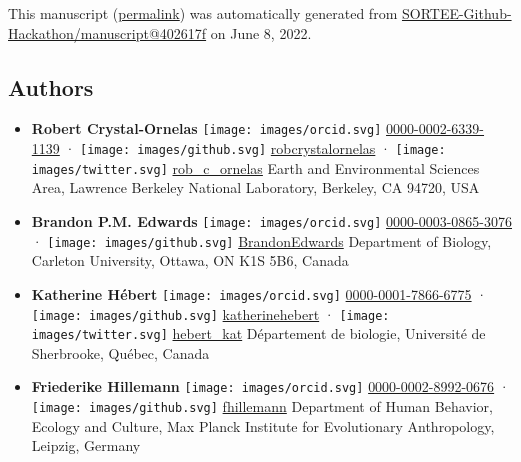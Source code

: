 This manuscript
(\href{https://SORTEE-Github-Hackathon.github.io/manuscript/v/402617f9e4b0caf2a3e126b79bf17059d3cfef8c/}{permalink})
was automatically generated
from \href{https://github.com/SORTEE-Github-Hackathon/manuscript/tree/402617f9e4b0caf2a3e126b79bf17059d3cfef8c}{SORTEE-Github-Hackathon/manuscript@402617f}
on June 8, 2022.

\hypertarget{authors}{%
\subsection{Authors}\label{authors}}

\begin{itemize}
\item
  \textbf{Robert Crystal-Ornelas}
  \texttt{[image: images/orcid.svg]}
  \href{https://orcid.org/0000-0002-6339-1139}{0000-0002-6339-1139}
  · \texttt{[image: images/github.svg]}
  \href{https://github.com/robcrystalornelas}{robcrystalornelas}
  · \texttt{[image: images/twitter.svg]}
  \href{https://twitter.com/rob_c_ornelas}{rob\_c\_ornelas}
  Earth and Environmental Sciences Area, Lawrence Berkeley National Laboratory, Berkeley, CA 94720, USA
\item
  \textbf{Brandon P.M. Edwards}
  \texttt{[image: images/orcid.svg]}
  \href{https://orcid.org/0000-0003-0865-3076}{0000-0003-0865-3076}
  · \texttt{[image: images/github.svg]}
  \href{https://github.com/BrandonEdwards}{BrandonEdwards}
  Department of Biology, Carleton University, Ottawa, ON K1S 5B6, Canada
\item
  \textbf{Katherine Hébert}
  \texttt{[image: images/orcid.svg]}
  \href{https://orcid.org/0000-0001-7866-6775}{0000-0001-7866-6775}
  · \texttt{[image: images/github.svg]}
  \href{https://github.com/katherinehebert}{katherinehebert}
  · \texttt{[image: images/twitter.svg]}
  \href{https://twitter.com/hebert_kat}{hebert\_kat}
  Département de biologie, Université de Sherbrooke, Québec, Canada
\item
  \textbf{Friederike Hillemann}
  \texttt{[image: images/orcid.svg]}
  \href{https://orcid.org/0000-0002-8992-0676}{0000-0002-8992-0676}
  · \texttt{[image: images/github.svg]}
  \href{https://github.com/fhillemann}{fhillemann}
  Department of Human Behavior, Ecology and Culture, Max Planck Institute for Evolutionary Anthropology, Leipzig, Germany

\end{itemize}
